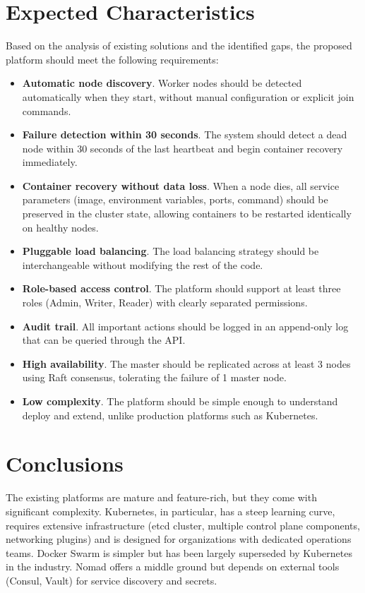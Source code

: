 \section{Expected Characteristics}

Based on the analysis of existing solutions and the identified gaps, the proposed platform should meet the following requirements:

\begin{itemize}
    \item \textbf{Automatic node discovery}. Worker nodes should be detected automatically when they start, without manual configuration or explicit join commands.
    \item \textbf{Failure detection within 30 seconds}. The system should detect a dead node within 30 seconds of the last heartbeat and begin container recovery immediately.
    \item \textbf{Container recovery without data loss}. When a node dies, all service parameters (image, environment variables, ports, command) should be preserved in the cluster state, allowing containers to be restarted identically on healthy nodes.
    \item \textbf{Pluggable load balancing}. The load balancing strategy should be interchangeable without modifying the rest of the code.
    \item \textbf{Role-based access control}. The platform should support at least three roles (Admin, Writer, Reader) with clearly separated permissions.
    \item \textbf{Audit trail}. All important actions should be logged in an append-only log that can be queried through the API.
    \item \textbf{High availability}. The master should be replicated across at least 3 nodes using Raft consensus, tolerating the failure of 1 master node.
    \item \textbf{Low complexity}. The platform should be simple enough to understand deploy and extend, unlike production platforms such as Kubernetes.
\end{itemize}

\section{Conclusions}

The existing platforms are mature and feature-rich, but they come with significant complexity. Kubernetes, in particular, has a steep learning curve, requires extensive infrastructure (etcd cluster, multiple control plane components, networking plugins) and is designed for organizations with dedicated operations teams. Docker Swarm is simpler but has been largely superseded by Kubernetes in the industry. Nomad offers a middle ground but depends on external tools (Consul, Vault) for service discovery and secrets.


